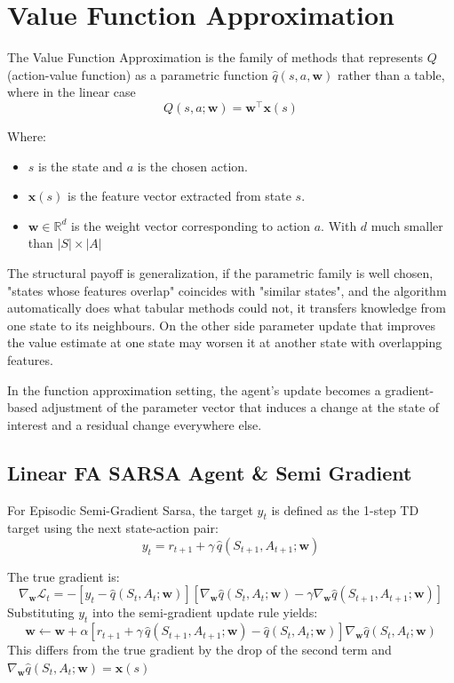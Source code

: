 \documentclass[pdflatex,sn-mathphys-num]{sn-jnl}
\begin{document}
\section{Value Function Approximation}
\label{sec:vfa}

The Value Function Approximation is the family of methods that represents
$Q$ (action-value function) as a parametric function $\hat{q}(s,a,\mathbf{w})$
rather than a table, where in the linear case $$Q(s, a; \mathbf{w}) = \mathbf{w}^\top \mathbf{x}(s)$$

Where: 
\begin{itemize}
    \item $s$ is the state and $a$ is the chosen action.
    \item $\mathbf{x}(s)$ is the feature vector extracted from state $s$.  
    \item $\mathbf{w} \in \mathbb{R}^d$ is the weight vector corresponding to action $a$. With $d$ much smaller than $|S| \times |A|$  
\end{itemize}

The structural payoff is generalization, if the parametric family is well chosen, "states whose features overlap" coincides with "similar states", and the algorithm automatically does what tabular methods could not, it transfers knowledge from one state to its neighbours.
On the other side parameter update that improves the value estimate at one state may worsen it at another state with overlapping features.

In the function approximation setting, the agent's update becomes a gradient-based adjustment of the parameter vector that induces a change at the state of interest and a residual change everywhere else.
\subsection{Linear FA SARSA Agent \& Semi Gradient}
For Episodic Semi-Gradient Sarsa, the target $y_t$ is defined as the 1-step TD target using the next state-action pair:$$y_t = r_{t+1} + \gamma \, \hat{q}(S_{t+1}, A_{t+1}; \mathbf{w})$$

The true gradient is: $$\nabla_{\mathbf{w}} \mathcal{L}_t = - \left[ y_t - \hat{q}(S_t, A_t; \mathbf{w}) \right] \left[ \nabla_{\mathbf{w}} \hat{q}(S_t, A_t; \mathbf{w}) - \gamma \nabla_{\mathbf{w}} \hat{q}(S_{t+1}, A_{t+1}; \mathbf{w}) \right]$$
Substituting $y_t$ into the semi-gradient update rule yields:$$\mathbf{w} \leftarrow \mathbf{w} + \alpha \left[ r_{t+1} + \gamma \, \hat{q}(S_{t+1}, A_{t+1}; \mathbf{w}) - \hat{q}(S_t, A_t; \mathbf{w}) \right] \nabla_{\mathbf{w}} \hat{q}(S_t, A_t; \mathbf{w})$$
This differs from the true gradient by the drop of the second term and $\nabla_{\mathbf{w}} \hat{q}(S_t, A_t; \mathbf{w}) = \mathbf{x}(s)$
\end{document}
